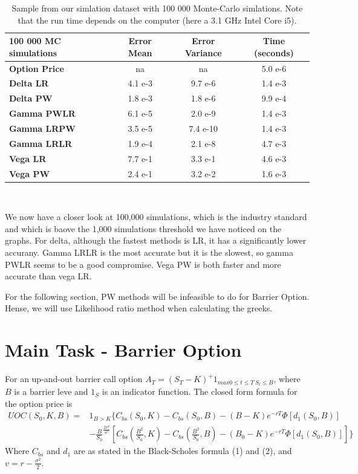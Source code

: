 \documentclass[12pt,a4paper,fleqn]{article}
\begin{document}
\begin{table}
  \centering
\label{eco:values}
\begin{tabular}{|l|c|c|c|}
\hline
100 000 MC simulations      & \textbf{Error Mean} & \textbf{Error Variance} & \textbf{Time (seconds)} \\ \hline
\textbf{Option Price} & na &          na         & 5.0 e-6 \\ \hline
\textbf{Delta LR} & 4.1 e-3 & 9.7 e-6 & 1.4 e-3\\
\textbf{Delta PW} & 1.8 e-3 & 1.8 e-6 & 9.9 e-4\\ \hline
\textbf{Gamma PWLR} & 6.1 e-5 & 2.0 e-9 & 1.4 e-3\\
\textbf{Gamma LRPW} & 3.5 e-5 & 7.4 e-10 & 1.4 e-3\\
\textbf{Gamma LRLR} & 1.9 e-4 & 2.1 e-8 & 4.7 e-3\\ \hline
\textbf{Vega LR} & 7.7 e-1 & 3.3 e-1 & 4.6 e-3\\
\textbf{Vega PW} & 2.4 e-1 & 3.2 e-2 & 1.6 e-3\\ \hline
\end{tabular}\\

\caption{Sample from our simlation dataset with 100 000 Monte-Carlo simlations. Note that the run time depends on the computer (here a 3.1 GHz Intel Core i5).}

\end{table}

We now have a closer look at 100,000 simulations, which is the industry standard and which is baove the 1,000 simulations threshold we have noticed on the graphs.
For delta, although the fastest methods is LR, it has a significantly lower accurany. Gamma LRLR is the most accurate but it is the slowest, so gamma PWLR seems to be a good compromise. Vega PW is both faster and more accurate than vega LR.

For the following section, PW methods will be infeasible to do for Barrier Option. Hense, we will use Likelihood ratio method when calculating the greeks.

\FloatBarrier

\section{Main Task - Barrier Option}

For an up-and-out barrier call option $A_T=(S_T-K)^+1_{max 0\leq t\leq T \  S_t\leq B}$, where $B$ is a barrier leve and $1_S$ is an indicator function. The closed form formula for the option price is
\begin{equation}
\begin{aligned}
UOC(S_0,K,B) ={} &1_{B>K} \{ C_{bs}(S_0, K)-C_{bs}(S_0,B)-(B-K)e^{-rT}\Phi[d_{1}(S_0,B)] \\
      & -\frac{B}{S_0}^{\frac{2v^2}{\sigma^2}}\left[C_{bs}(\frac{B^2}{S_0}, K)-C_{bs}(\frac{B^2}{S_0}, B) -(B_0-K)e^{-rT}\Phi[d_{1}(S_0,B)]\right]\}
\end{aligned}
\end{equation}
Where $C_{bs}$ and $d_{1}$ are as stated in the Black-Scholes formula (1) and (2), and $v=r-\frac{\sigma^2}{2}$.\\
\end{document}
